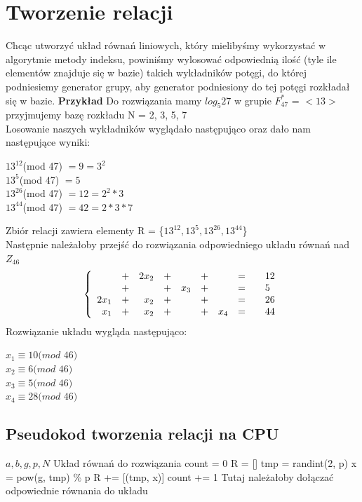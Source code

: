 \documentclass{article}
\begin{document}
\section{Tworzenie relacji}\label{Algorytm tworzenia relacji}
Chcąc utworzyć układ równań liniowych, który mielibyśmy wykorzystać w algorytmie metody indeksu, powiniśmy wylosować odpowiednią ilość (tyle ile elementów znajduje się w bazie) takich wykładników potęgi, do której podniesiemy generator grupy, aby generator podniesiony do tej potęgi rozkładał się w bazie.
\textbf{Przykład}
Do rozwiązania mamy $log_{5}27$ w grupie $F_{47}^*$ = $<13>$ przyjmujemy bazę rozkładu N = {2, 3, 5, 7}\\
Losowanie naszych wykładników wyglądało następująco oraz dało nam następujące wyniki:
\begin{center}
    $13^{12}$(mod 47) $= 9 = 3^2$\\ 
    $13^5$(mod 47) $ =5$\\
    $13^{26}$(mod 47) $= 12 = 2^2 * 3$\\
    $13^{44}$(mod 47) $= 42 = 2 * 3 * 7$\\
\end{center}
Zbiór relacji zawiera elementy R = \{$13^{12}, 13^{5}, 13^{26}, 13^{44}$\}\\
Następnie należałoby przejść do rozwiązania odpowiedniego układu równań nad $Z_{46}$
\[
\left\{
\begin{array}{rcrcrcrc@{\qquad}l}
                & +  & 2x_2 & +   &     & + &  & =  & 12 \\
                & +  &      & +   & x_3 & + &  & =  &  5\\
                2x_1 &        +   & x_2 & + &  & + &  & =  & 26 \\
                x_1  &        +   & x_2 & + &  & + & x_4 & =  & 44 \\
\end{array}
\right.
\]
Rozwiązanie układu wygląda następująco:
\begin{center}
$x_1 \equiv 10 (mod$ $46)$\\
$x_2 \equiv 6 (mod$ $46)$\\
$x_3 \equiv 5 (mod$ $46)$\\
$x_4 \equiv 28 (mod$ $46)$\\
\end{center}
\newpage
\subsection{Pseudokod tworzenia relacji na CPU}
\begin{algorithm}[H]
\renewcommand{\algorithmicrequire}{\textbf{Wejście:}}
\renewcommand{\algorithmicensure}{\textbf{Wyjście:}}
\begin{algorithmic}[1]
    \REQUIRE $a, b, g, p, N$
    \ENSURE  Układ równań do rozwiązania
\STATE count = 0
\STATE R = []
\STATE tmp = randint(2, p)
\STATE x = pow(g, tmp) \% p
\STATE R += [(tmp, x)]
\STATE count += 1
\ENDIF
\ENDWHILE
{}
\STATE Tutaj należałoby dołączać odpowiednie równania do układu
\ENDFOR
{}
\end{algorithmic}
\end{algorithm}
\end{document}
